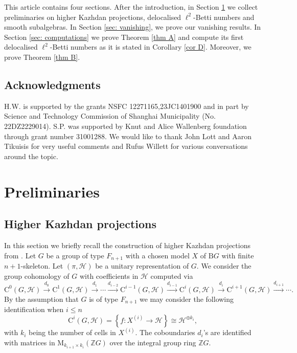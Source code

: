 \documentclass[a4paper,leqno,12pt]{article}
\numberwithin{equation}{section}
\theoremstyle{plain}
\theoremstyle{definition}
\theoremstyle{remark}
\newcommand{\ra}{\rightarrow}
\begin{document}
	This article contains four sections. After the introduction, in Section \ref{sec:preliminaries} we collect preliminaries on higher Kazhdan projections, delocalised $\ell^2$-Betti numbers and smooth subalgebras. 
	In Section \ref{sec: vanishing}, we prove our vanishing results. In Section \ref{sec: computations} we prove Theorem \ref{thm A} and compute its first delocalised $\ell^2$-Betti numbers as it is stated in Corollary \ref{cor D}. Moreover, we prove Theorem \ref{thm B}.
	
	\subsection*{Acknowledgments}
	H.W. is supported by the grants NSFC 12271165,23JC1401900 and in part by Science and Technology Commission of Shanghai Municipality (No. 22DZ2229014). S.P. was supported by Knut and Alice Wallenberg foundation through grant number 31001288. We would like to thank John Lott and Aaron Tikuisis for very useful comments and Rufus Willett for various conversations around the topic.
	
	\section{Preliminaries}
	\label{sec:preliminaries}
	\subsection{Higher Kazhdan projections} \label{subsec:higher Kazh proj}
	In this section we briefly recall the construction of higher Kazhdan projections from \cite{linowakpooya2020}. 
	Let $G$ be a group of type $F_{n+1}$ with a chosen model $X$ of $\mathrm B G$ with finite $n+1$-skeleton.
	Let $(\pi, \mathcal H)$ be a unitary representation of $G$. We consider the group cohomology of $G$ with coefficients in $\mathcal H$ computed via 
	\[
	\mathrm{C}^0(G, \mathcal H) 
	\stackrel{d_0} \longrightarrow \mathrm{C}^1(G, \mathcal H)
	\stackrel{d_1}  \longrightarrow \cdots 
	\stackrel{d_{i-2}}\longrightarrow
	\mathrm{C}^{i-1}(G, \mathcal H) 
	\stackrel{d_{i-1}} \longrightarrow  \mathrm{C}^i(G, \mathcal H)
	\stackrel{d_i}  \longrightarrow  \mathrm{C}^{i+1}(G, \mathcal H)
	\stackrel{d_{i+1}} \longrightarrow  \cdots.
	\]
	By the assumption that $G$ is of type $F_{n+1}$ we may consider the following identification when $i \leq n$
	\[
	\mathrm{C}^i(G, \mathcal H) = \left\{ f \colon X^{(i)} \ra \mathcal H\right\} \cong \mathcal H ^{\oplus k_i},
	\]
	with $k_i$ being the number of cells in $X^{(i)}$.
	The coboundaries $d_i$'s are identified with matrices in 
	$\mathrm {M}_{k_{i+1} \times k_i}(\mathbb{Z} G)$ over the integral group ring $\mathbb {Z}G$.
	
\end{document}
